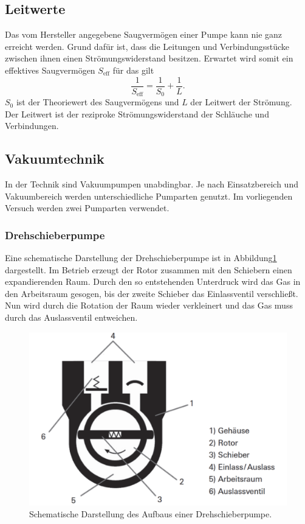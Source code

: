 \subsection{Leitwerte}
Das vom Hersteller angegebene Saugvermögen einer Pumpe kann nie ganz erreicht werden.
Grund dafür ist, dass die Leitungen und Verbindungsstücke zwischen ihnen einen Strömungswiderstand besitzen.
Erwartet wird somit ein effektives Saugvermögen $S_\text{eff}$ für das gilt
\begin{equation}
  \frac{1}{S_\text{eff}}=\frac{1}{S_0}+\frac{1}{L}.
\end{equation}
$S_0$ ist der Theoriewert des Saugvermögens und $L$ der Leitwert der Strömung.\\
Der Leitwert ist der reziproke Strömungswiderstand der Schläuche und Verbindungen.
\subsection{Vakuumtechnik}
In der Technik sind Vakuumpumpen unabdingbar.
Je nach Einsatzbereich und Vakuumbereich werden unterschiedliche Pumparten genutzt.
Im vorliegenden Versuch werden zwei Pumparten verwendet.\\
\subsubsection{Drehschieberpumpe}
Eine schematische Darstellung der Drehschieberpumpe ist in Abbildung\ref{drehschema} dargestellt. Im Betrieb erzeugt der Rotor zusammen mit den Schiebern einen expandierenden Raum. Durch den so entstehenden Unterdruck wird
das Gas in den Arbeitsraum gesogen, bis der zweite Schieber das Einlassventil verschließt. Nun wird durch die Rotation der Raum wieder verkleinert und das Gas muss durch das Auslassventil entweichen.
\begin{figure}[H]
  \centering
  \includegraphics[scale=0.4]{Bilder/drehschieber.png}
  \caption{Schematische Darstellung des Aufbaus einer Drehschieberpumpe.\cite{schemadreh}}
  \label{drehschema}
\end{figure}

